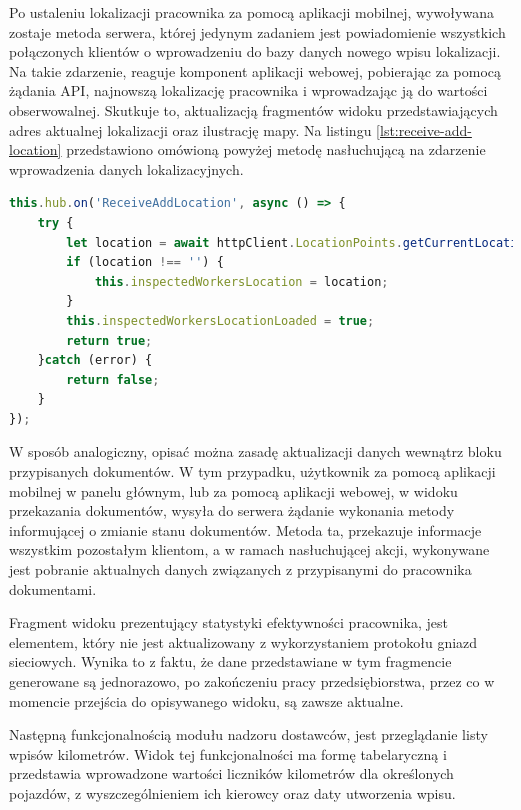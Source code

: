 Po ustaleniu lokalizacji pracownika za pomocą aplikacji mobilnej, wywoływana zostaje metoda serwera, której jedynym zadaniem jest powiadomienie wszystkich połączonych klientów o wprowadzeniu do bazy danych nowego wpisu lokalizacji. Na takie zdarzenie, reaguje komponent aplikacji webowej, pobierając za pomocą żądania API, najnowszą lokalizację pracownika i wprowadzając ją do wartości obserwowalnej. Skutkuje to, aktualizacją fragmentów widoku przedstawiających adres aktualnej lokalizacji oraz ilustrację mapy.
Na listingu \ref{lst:receive-add-location} przedstawiono omówioną powyżej metodę nasłuchującą na zdarzenie wprowadzenia danych lokalizacyjnych.

\begin{lstlisting}[label=lst:receive-add-location,caption=Kod akcji nasłuchującej na zdarzenie dodania lokalizacji pracownika, captionpos=b,basicstyle=\footnotesize\ttfamily,language=JavaScript]
this.hub.on('ReceiveAddLocation', async () => {
	try {
		let location = await httpClient.LocationPoints.getCurrentLocationForWorker(this.selectedWorkerToInspect.id);
		if (location !== '') {
			this.inspectedWorkersLocation = location;
		}
		this.inspectedWorkersLocationLoaded = true;
		return true;
	}catch (error) {
		return false;
	}
});
\end{lstlisting}

W sposób analogiczny, opisać można zasadę aktualizacji danych wewnątrz bloku przypisanych dokumentów. W tym przypadku, użytkownik za pomocą aplikacji mobilnej w panelu głównym, lub za pomocą aplikacji webowej, w widoku przekazania dokumentów, wysyła do serwera żądanie wykonania metody informującej o zmianie stanu dokumentów. Metoda ta, przekazuje informacje wszystkim pozostałym klientom, a w ramach nasłuchującej akcji, wykonywane jest pobranie aktualnych danych związanych z przypisanymi do pracownika dokumentami.

Fragment widoku prezentujący statystyki efektywności pracownika, jest elementem, który nie jest aktualizowany z wykorzystaniem protokołu gniazd sieciowych. Wynika to z faktu, że dane przedstawiane w tym fragmencie generowane są jednorazowo, po zakończeniu pracy przedsiębiorstwa, przez co w momencie przejścia do opisywanego widoku, są zawsze aktualne.

Następną funkcjonalnością modułu nadzoru dostawców, jest przeglądanie listy wpisów kilometrów. Widok tej funkcjonalności ma formę tabelaryczną i przedstawia wprowadzone wartości liczników kilometrów dla określonych pojazdów, z wyszczególnieniem ich kierowcy oraz daty utworzenia wpisu.

